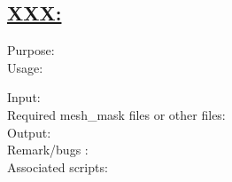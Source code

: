 \newpage
\subsection*{\underline{XXX:}}
\begin{description}
\item[Purpose:]
\item[Usage:] {\em }
\item[Input:]
\item[Required mesh\_mask files or other files:]
\item[Output:] 
\item[Remark/bugs :]
\item[Associated scripts:]
\end{description}
